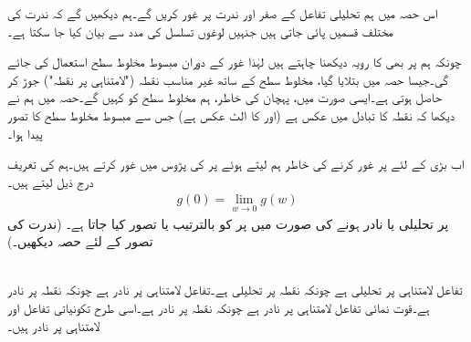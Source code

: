 اس حصہ میں ہم تحلیلی تفاعل کے صفر اور ندرت پر غور کریں گے۔ہم دیکھیں گے کہ ندرت کی مختلف قسمیں پائی جاتی ہیں جنہیں لوغوں تسلسل کی مدد سے بیان کیا جا سکتا ہے۔

چونکہ ہم  پر بھی  کا رویہ دیکھنا چاہتے ہیں لہٰذا غور کے دوران مبسوط مخلوط سطح استعمال کی جائے گی۔جیسا  حصہ  میں بتلایا گیا، مخلوط سطح کے ساتھ غیر مناسب نقطہ  ("لامتناہی پر نقطہ") جوڑ کر  حاصل ہوتی ہے۔ایسی صورت میں، پہچان کی خاطر، ہم مخلوط سطح کو  کہیں گے۔حصہ  میں ہم نے دیکھا کہ  نقطہ  کا تبادل  میں عکس  ہے (اور  کا الٹ عکس  ہے) جس سے مبسوط مخلوط سطح کا تصور پیدا ہوا۔ 

اب  بڑی  کے لئے   پر غور کرنے کی خاطر ہم  لیتے ہوئے  پر  کی پڑوس میں غور کرتے ہیں۔ہم  کی تعریف درج ذیل لیتے ہیں۔
\begin{align}
g(0)=\lim_{w\to 0} g(w)
\end{align}
 پر  تحلیلی یا نادر ہونے کی صورت میں   پر  کو بالترتیب   یا  تصور کیا جاتا ہے۔ (ندرت کی تصور کے لئے حصہ  دیکھیں۔) 

\quad {}\\
تفاعل  لامتناہی پر تحلیلی ہے چونکہ  نقطہ  پر تحلیلی ہے۔تفاعل  لامتناہی پر نادر ہے چونکہ  نقطہ  پر نادر ہے۔قوت نمائی تفاعل  لامتناہی پر نادر ہے چونکہ  نقطہ  پر نادر ہے۔اسی طرح تکونیاتی تفاعل  اور  لامتناہی پر نادر ہیں۔

